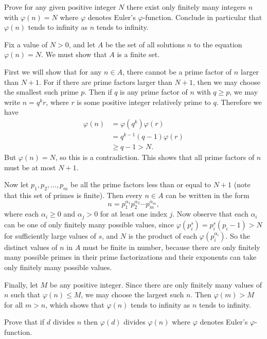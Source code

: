  Prove for any given positive integer $N$ there exist
only finitely many integers $n$ with $\varphi(n) = N$ where $\varphi$
denotes Euler's $\varphi$-function. Conclude in particular that
$\varphi(n)$ tends to infinity as $n$ tends to infinity.
\begin{solution}
  Fix a value of $N>0$, and let $A$ be the set of all solutions $n$ to
  the equation $\varphi(n) = N$. We must show that $A$ is a finite
  set.

  First we will show that for any $n\in A$, there cannot be a prime
  factor of $n$ larger than $N + 1$. For if there are prime factors
  larger than $N + 1$, then we may choose the smallest such prime
  $p$. Then if $q$ is any prime factor of $n$ with $q\geq p$, we may
  write $n = q^kr$, where $r$ is some positive integer relatively
  prime to $q$. Therefore we have
  \begin{align*}
    \varphi(n) &= \varphi(q^k)\varphi(r) \\
               &= q^{k-1}(q - 1)\varphi(r) \\
               &\geq q - 1 > N.
  \end{align*}
  But $\varphi(n) = N$, so this is a contradiction. This shows that
  all prime factors of $n$ must be at most $N + 1$.

  Now let $p_1, p_2, \ldots, p_m$ be all the prime factors less than
  or equal to $N + 1$ (note that this set of primes is finite). Then
  every $n\in A$ can be written in the form
  \begin{equation*}
    n = p_1^{\alpha_1}p_2^{\alpha_2}\cdots p_m^{\alpha_m},
  \end{equation*}
  where each $\alpha_i\geq 0$ and $\alpha_j > 0$ for at least one
  index $j$. Now observe that each $\alpha_i$ can be one of only
  finitely many possible values, since
  $\varphi(p_i^s) = p_i^s(p_i - 1) > N$ for sufficiently large values
  of $s$, and $N$ is the product of each $\varphi(p_i^{\alpha_i})$. So
  the distinct values of $n$ in $A$ must be finite in number, because
  there are only finitely many possible primes in their prime
  factorizations and their exponents can take only finitely many
  possible values.

  Finally, let $M$ be any positive integer. Since there are only
  finitely many values of $n$ such that $\varphi(n) \leq M$, we may
  choose the largest such $n$. Then $\varphi(m) > M$ for all $m>n$,
  which shows that $\varphi(n)$ tends to infinity as $n$ tends to
  infinity.
\end{solution}

 Prove that if $d$ divides $n$ then $\varphi(d)$ divides
$\varphi(n)$ where $\varphi$ denotes Euler's $\varphi$-function.
